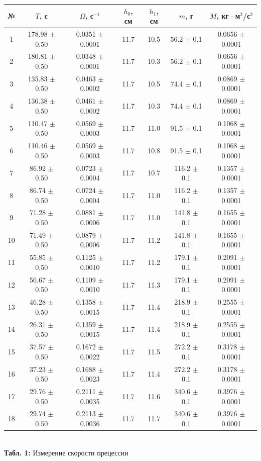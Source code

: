 \documentclass[12pt,a4paper]{scrartcl}
\begin{document}
	\begin{center}
		\begin{tabular}{|c|c|c|c|c|c|c|}
			\hline
			№  & $T$, с & $\Omega$, с$^{-1}$ & $h_0$, см & $h_1$, см & $m$, г          & $M$, кг$\,\cdot\,$м$^2$/с$^2$\\ \hline
			1  & 178.98 $\pm$ 0.50 & 0.0351 $\pm$ 0.0001 & 11.7 & 10.5 & 56.2  $\pm$ 0.1 & 0.0656 $\pm$ 0.0001\\ \hline
			2  & 180.81 $\pm$ 0.50 & 0.0348 $\pm$ 0.0001 & 11.7 & 10.3 & 56.2  $\pm$ 0.1 & 0.0656 $\pm$ 0.0001\\ \hline
			3  & 135.83 $\pm$ 0.50 & 0.0463 $\pm$ 0.0002 & 11.7 & 10.5 & 74.4  $\pm$ 0.1 & 0.0869 $\pm$ 0.0001\\ \hline
			4  & 136.38 $\pm$ 0.50 & 0.0461 $\pm$ 0.0002 & 11.7 & 10.3 & 74.4  $\pm$ 0.1 & 0.0869 $\pm$ 0.0001\\ \hline
			5  & 110.47 $\pm$ 0.50 & 0.0569 $\pm$ 0.0003 & 11.7 & 11.0 & 91.5  $\pm$ 0.1 & 0.1068 $\pm$ 0.0001 \\ \hline
			6  & 110.46 $\pm$ 0.50 & 0.0569 $\pm$ 0.0003 & 11.7 & 10.8 & 91.5  $\pm$ 0.1 & 0.1068 $\pm$ 0.0001\\ \hline
			7  & 86.92  $\pm$ 0.50 & 0.0723 $\pm$ 0.0004 & 11.7 & 10.7 & 116.2 $\pm$ 0.1 & 0.1357 $\pm$ 0.0001\\ \hline
			8  & 86.74  $\pm$ 0.50 & 0.0724 $\pm$ 0.0004 & 11.7 & 11.0 & 116.2 $\pm$ 0.1 & 0.1357 $\pm$ 0.0001\\ \hline
			9  & 71.28  $\pm$ 0.50 & 0.0881 $\pm$ 0.0006 & 11.7 & 11.0 & 141.8 $\pm$ 0.1 & 0.1655 $\pm$ 0.0001\\ \hline
			10 & 71.49  $\pm$ 0.50 & 0.0879 $\pm$ 0.0006 & 11.7 & 11.2 & 141.8 $\pm$ 0.1 & 0.1655 $\pm$ 0.0001\\ \hline
			11 & 55.85  $\pm$ 0.50 & 0.1125 $\pm$ 0.0010 & 11.7 & 11.2 & 179.1 $\pm$ 0.1 & 0.2091 $\pm$ 0.0001\\ \hline
			12 & 56.67  $\pm$ 0.50 & 0.1109 $\pm$ 0.0010 & 11.7 & 11.3 & 179.1 $\pm$ 0.1 & 0.2091 $\pm$ 0.0001\\ \hline
			13 & 46.28  $\pm$ 0.50 & 0.1358 $\pm$ 0.0015 & 11.7 & 11.4 & 218.9 $\pm$ 0.1 & 0.2555 $\pm$ 0.0001\\ \hline
			14 & 26.31  $\pm$ 0.50 & 0.1359 $\pm$ 0.0015 & 11.7 & 11.4 & 218.9 $\pm$ 0.1 & 0.2555 $\pm$ 0.0001\\ \hline
			15 & 37.57  $\pm$ 0.50 & 0.1672 $\pm$ 0.0022 & 11.7 & 11.5 & 272.2 $\pm$ 0.1 & 0.3178 $\pm$ 0.0001\\ \hline
			16 & 37.23  $\pm$ 0.50 & 0.1688 $\pm$ 0.0023 & 11.7 & 11.4 & 272.2 $\pm$ 0.1 & 0.3178 $\pm$ 0.0001\\ \hline
			17 & 29.76  $\pm$ 0.50 & 0.2111 $\pm$ 0.0035 & 11.7 & 11.6 & 340.6 $\pm$ 0.1 & 0.3976 $\pm$ 0.0001\\ \hline
			18 & 29.74  $\pm$ 0.50 & 0.2113 $\pm$ 0.0036 & 11.7 & 11.7 & 340.6 $\pm$ 0.1 & 0.3976 $\pm$ 0.0001\\ \hline
		\end{tabular}
		\\\textbf{Табл. 1: } Измерение скорости прецессии
	\end{center}
	
\end{document}
